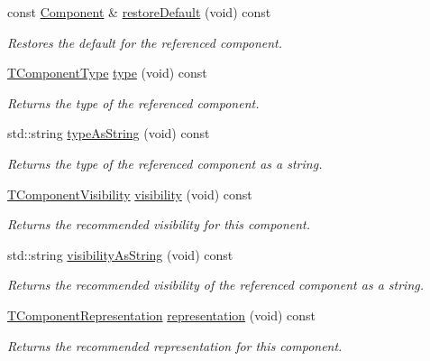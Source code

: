 \begin{DoxyCompactItemize}
const \hyperlink{classmv_i_m_p_a_c_t_1_1acquire_1_1_component}{Component} \& \hyperlink{classmv_i_m_p_a_c_t_1_1acquire_1_1_component_aa13d62964b8282fd66f6d4fae48f85b2}{restore\+Default} (void) const 
\begin{DoxyCompactList}\small\item\em Restores the default for the referenced component. \end{DoxyCompactList}\item 
\hyperlink{group___common_interface_ga7dbe9709a3bdae0b29581ff4f6fca3ff}{T\+Component\+Type} \hyperlink{classmv_i_m_p_a_c_t_1_1acquire_1_1_component_a57b0745fbaeca5fb4cf3e35fd3143002}{type} (void) const 
\begin{DoxyCompactList}\small\item\em Returns the type of the referenced component. \end{DoxyCompactList}\item 
std\+::string \hyperlink{classmv_i_m_p_a_c_t_1_1acquire_1_1_component_a9e5b5315cc8649d5dbed13c8810e7649}{type\+As\+String} (void) const 
\begin{DoxyCompactList}\small\item\em Returns the type of the referenced component as a string. \end{DoxyCompactList}\item 
\hyperlink{group___common_interface_ga75b333e3ba771df98bde9ee1e12f57a0}{T\+Component\+Visibility} \hyperlink{classmv_i_m_p_a_c_t_1_1acquire_1_1_component_a986c68167207123176b6ffe03f974cf3}{visibility} (void) const 
\begin{DoxyCompactList}\small\item\em Returns the recommended visibility for this component. \end{DoxyCompactList}\item 
std\+::string \hyperlink{classmv_i_m_p_a_c_t_1_1acquire_1_1_component_aae8c83e09af9886109e2c68533bdd7ec}{visibility\+As\+String} (void) const 
\begin{DoxyCompactList}\small\item\em Returns the recommended visibility of the referenced component as a string. \end{DoxyCompactList}\item 
\hyperlink{group___common_interface_ga1e2d7ac6b3bb3ff1fe4bb53c4aa808ea}{T\+Component\+Representation} \hyperlink{classmv_i_m_p_a_c_t_1_1acquire_1_1_component_a877be25f91d98b261ace18060126c0e6}{representation} (void) const 
\begin{DoxyCompactList}\small\item\em Returns the recommended representation for this component. \end{DoxyCompactList}\item 

\end{DoxyCompactItemize}
